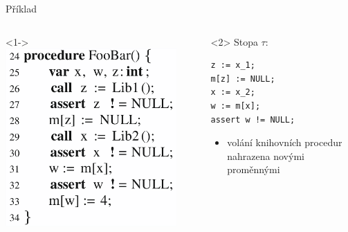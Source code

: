 \documentclass[11pt]{beamer}
\begin{document}


\begin{frame}[fragile]{Příklad}
\begin{columns}

\begin{column}{0.5\textwidth}<1->
\includegraphics[width=0.9\textwidth]{img/fooBar.png}
\end{column}

\begin{column}{0.5\textwidth}<2>
Stopa $\tau$:
\begin{lstlisting}
z := x_1;
m[z] := NULL;
x := x_2;
w := m[x];
assert w != NULL;
\end{lstlisting}

\begin{itemize}

\item volání knihovních procedur nahrazena novými proměnnými
\end{itemize}


\end{column}

\end{columns}
\end{frame}
\end{document}
